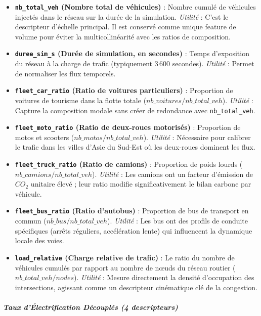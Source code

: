 \documentclass[10pt, a4paper]{article}
\providecommand{\tightlist}{}
\begin{document}
\begin{itemize}
\tightlist
\item
  \textbf{\texttt{nb\_total\_veh} (Nombre total de véhicules)} : Nombre
  cumulé de véhicules injectés dans le réseau sur la durée de la
  simulation. \emph{Utilité} : C'est le descripteur d'échelle principal.
  Il est conservé comme unique feature de volume pour éviter la
  multicollinéarité avec les ratios de composition.
\item
  \textbf{\texttt{duree\_sim\_s} (Durée de simulation, en secondes)} :
  Temps d'exposition du réseau à la charge de trafic (typiquement 3\,600
  secondes). \emph{Utilité} : Permet de normaliser les flux temporels.
\item
  \textbf{\texttt{fleet\_car\_ratio} (Ratio de voitures particuliers)} :
  Proportion de voitures de tourisme dans la flotte totale
  (\(nb\_voitures / nb\_total\_veh\)). \emph{Utilité} : Capture la
  composition modale sans créer de redondance avec
  \texttt{nb\_total\_veh}.
\item
  \textbf{\texttt{fleet\_moto\_ratio} (Ratio de deux-roues motorisés)} :
  Proportion de motos et scooters (\(nb\_motos / nb\_total\_veh\)).
  \emph{Utilité} : Nécessaire pour calibrer le trafic dans les villes
  d'Asie du Sud-Est où les deux-roues dominent les flux.
\item
  \textbf{\texttt{fleet\_truck\_ratio} (Ratio de camions)} : Proportion
  de poids lourds (\(nb\_camions / nb\_total\_veh\)). \emph{Utilité} :
  Les camions ont un facteur d'émission de \(CO_2\) unitaire élevé ;
  leur ratio modifie significativement le bilan carbone par véhicule.
\item
  \textbf{\texttt{fleet\_bus\_ratio} (Ratio d'autobus)} : Proportion de
  bus de transport en commun (\(nb\_bus / nb\_total\_veh\)).
  \emph{Utilité} : Les bus ont des profils de conduite spécifiques
  (arrêts réguliers, accélération lente) qui influencent la dynamique
  locale des voies.
\item
  \textbf{\texttt{load\_relative} (Charge relative de trafic)} : Le
  ratio du nombre de véhicules cumulés par rapport au nombre de nœuds du
  réseau routier (\(nb\_total\_veh / nodes\)). \emph{Utilité} : Mesure
  directement la densité d'occupation des intersections, agissant comme
  un descripteur cinématique clé de la congestion.
\end{itemize}

\subparagraph{Taux d'Électrification Découplés (4
descripteurs)}\label{taux-duxe9lectrification-duxe9coupluxe9s-4-descripteurs-1}
\end{document}
